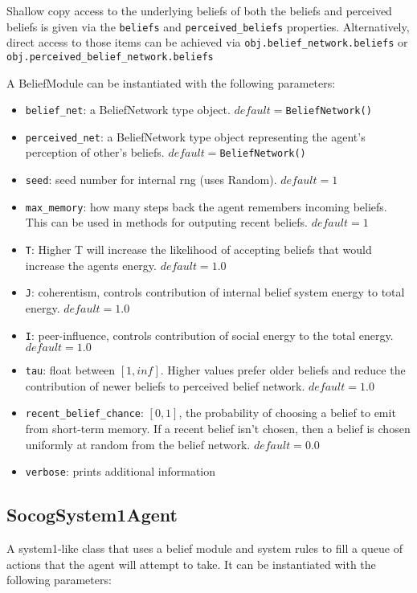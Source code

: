 \documentclass[11pt, a4paper]{article}
\begin{document}
Shallow copy access to the underlying beliefs of both the beliefs and perceived beliefs is given via the \texttt{beliefs} and \texttt{perceived\_beliefs} properties. Alternatively, direct access to those items can be achieved via \texttt{obj.belief\_network.beliefs} or \texttt{obj.perceived\_belief\_network.beliefs}

A BeliefModule can be instantiated with the following parameters:
\begin{itemize}
    \item \texttt{belief\_net}: a BeliefNetwork type object. $default=$\texttt{BeliefNetwork()}
    \item \texttt{perceived\_net}: a BeliefNetwork type object representing the agent's perception of other's beliefs. $default=$\texttt{BeliefNetwork()}
    \item \texttt{seed}: seed number for internal rng (uses Random). $default=1$
    \item \texttt{max\_memory}: how many steps back the agent remembers incoming beliefs. This can be used in methods for outputing recent beliefs. $default=1$
    \item \texttt{T}: Higher T will increase the likelihood of accepting beliefs that would increase the agents energy. $default=1.0$
    \item \texttt{J}: coherentism, controls contribution of internal belief system energy to total energy. $default=1.0$
    \item \texttt{I}: peer-influence, controls contribution of social energy to the total energy. $default=1.0$
    \item \texttt{tau}: float between $[1,inf]$. Higher values prefer older beliefs and reduce the contribution of newer beliefs to perceived belief network. $default=1.0$
    \item \texttt{recent\_belief\_chance}: $[0,1]$, the probability of choosing a belief to emit from short-term memory. If a recent belief isn't chosen, then a belief is chosen uniformly at random from the belief network. $default=0.0$
    \item \texttt{verbose}: prints additional information
\end{itemize}

\subsection{SocogSystem1Agent}
A system1-like class that uses a belief module and system rules to fill a queue of actions that the agent will attempt to take. It can be instantiated with the following parameters:
\end{document}
